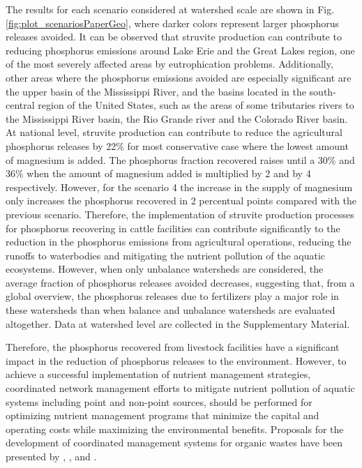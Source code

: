 \begin{refsection}[referencesCh3]

The results for each scenario considered at watershed scale are shown in Fig. \ref{fig:plot_scenariosPaperGeo}, where darker colors represent larger phosphorus releases avoided. It can be observed that struvite production can contribute to reducing phosphorus emissions around Lake Erie and the Great Lakes region, one of the most severely affected areas by eutrophication problems. Additionally, other areas where the phosphorus emissions avoided are especially significant are the upper basin of the Mississippi River, and the basins located in the south-central region of the United States, such as the areas of some tributaries rivers to the Mississippi River basin, the Rio Grande river and the Colorado River basin. At national level, struvite production can contribute to reduce the agricultural phosphorus releases by 22\% for most conservative case where the lowest amount of magnesium is added. The phosphorus fraction recovered raises until a 30\% and 36\% when the amount of magnesium added is multiplied by 2 and by 4 respectively. However, for the scenario 4 the increase in the supply of magnesium only increases the phosphorus recovered in 2 percentual points compared with the previous scenario. Therefore, the implementation of struvite production processes for phosphorus recovering in cattle facilities can contribute significantly to the reduction in the phosphorus emissions from agricultural operations, reducing the runoffs to waterbodies and mitigating the nutrient pollution of the aquatic ecosystems. However, when only unbalance watersheds are  considered, the average fraction of phosphorus releases avoided decreases, suggesting that, from a global overview, the phosphorus releases due to fertilizers play a major role in these watersheds than when balance and unbalance watersheds are evaluated altogether. Data at watershed level are collected in the Supplementary Material.

Therefore, the phosphorus recovered from livestock facilities have a significant impact in the reduction of phosphorus releases to the environment. However, to achieve a successful implementation of nutrient management strategies, coordinated network management efforts to mitigate nutrient pollution of aquatic systems including point and non-point sources, should be performed for optimizing nutrient management programs that minimize the capital and operating costs while maximizing the environmental benefits. Proposals for the development of coordinated management systems for organic wastes have been presented by \citet{Sharara}, \citet{Sampat3}, and \citet{hu_logistics_2019}.


\end{refsection}
